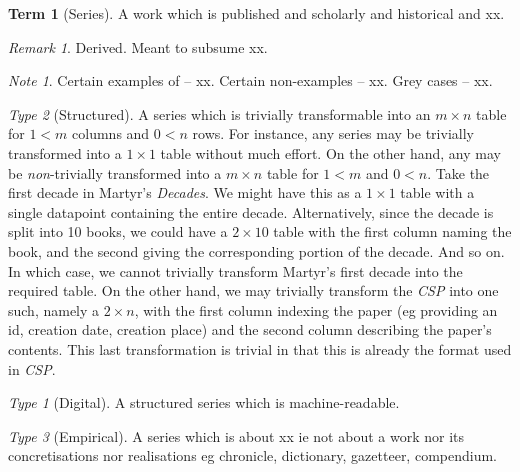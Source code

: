 \documentclass{amsart}%
\newcommand{\titleit}[1]{\textit{#1}}%
\theoremstyle{plain}
\theoremstyle{definition}
\theoremstyle{remark}
\newtheorem*{note}{Note}
\theoremstyle{definition}
\newtheorem{term}{Term}[subsection]%
\theoremstyle{remark}
\newtheorem*{term-type}{Type}
\newtheorem*{term-note}{Remark}
\begin{document}
\begin{term}[Series]
\label{term:series}
A work which is published and scholarly and historical and xx.
\begin{term-note}
Derived. Meant to subsume xx.
\end{term-note}
\begin{note}
Certain examples of -- xx. Certain non-examples -- xx. Grey cases -- xx.
\end{note}
\begin{term-type}[Structured]
A series which is trivially transformable into an \(m\times n\) table for \(1<m\) columns and \(0<n\) rows. For instance, any series may be trivially transformed into a \(1\times 1\) table without much effort. On the other hand, any may be \emph{non}-trivially transformed into a \(m\times n\) table for \(1<m\) and \(0<n\). Take the first decade in Martyr's \titleit{Decades}. We might have this as a \(1\times 1\) table with a single datapoint containing the entire decade. Alternatively, since the decade is split into 10 books, we could have a \(2\times 10\) table with the first column naming the book, and the second giving the corresponding portion of the decade. And so on. In which case, we cannot trivially transform Martyr's first decade into the required table. On the other hand, we may trivially transform the \titleit{CSP} into one such, namely a \(2\times n\), with the first column indexing the paper (eg providing an id, creation date, creation place) and the second column describing the paper's contents. This last transformation is trivial in that this is already the format used in \titleit{CSP}.
\begin{term-type}[Digital]
A structured series which is machine-readable.%
\end{term-type}%
\end{term-type}%
\begin{term-type}[Empirical]
A series which is about xx ie not about a work nor its concretisations nor realisations eg chronicle, dictionary, gazetteer, compendium.
\end{term-type}
\end{term}
%
%
%
%
%
\end{document}
